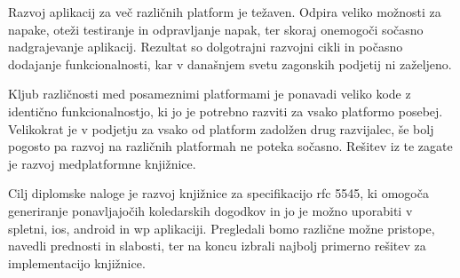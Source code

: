 







\begin{Povzetek}

Razvoj aplikacij za več različnih platform je težaven. Odpira veliko možnosti za napake, oteži testiranje in odpravljanje napak, ter skoraj onemogoči sočasno nadgrajevanje aplikacij. Rezultat so dolgotrajni razvojni cikli in počasno dodajanje funkcionalnosti, kar v današnjem svetu zagonskih podjetij ni zaželjeno.

Kljub različnosti med posameznimi platformami je ponavadi veliko kode z identično funkcionalnostjo, ki jo je potrebno razviti za vsako platformo posebej. Velikokrat je v podjetju za vsako od platform zadolžen drug razvijalec, še bolj pogosto pa razvoj na različnih platformah ne poteka sočasno. Rešitev iz te zagate je razvoj medplatformne knjižnice.

Cilj diplomske naloge je razvoj knjižnice za specifikacijo \gls{rfc} 5545, ki omogoča generiranje ponavljajočih koledarskih dogodkov in jo je možno uporabiti v spletni, \gls{ios}, \gls{android} in \gls{wp} aplikaciji. Pregledali bomo različne možne pristope, navedli prednosti in slabosti, ter na koncu izbrali najbolj primerno rešitev za implementacijo knjižnice.
\end{Povzetek}









